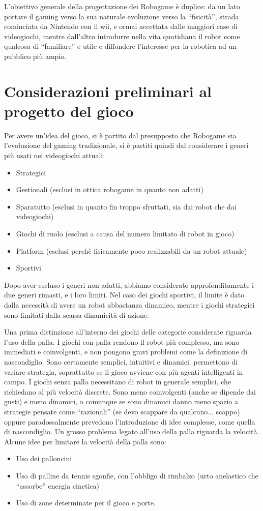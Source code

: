 L'obiettivo generale della progettazione dei Robogame è duplice: da un lato portare il gaming verso la sua naturale evoluzione verso la “fisicità”, strada cominciata da Nintendo con il wii, e ormai accettata dalle maggiori case di videogiochi, mentre dall'altro introdurre nella vita quotidiana il robot come qualcosa di “familiare” e utile e diffondere l’interesse per la robotica ad un pubblico più ampio.

\section{Considerazioni preliminari al progetto del gioco}
Per avere un’idea del gioco, si è partito dal presupposto che Robogame sia l’evoluzione del gaming tradizionale, si è partiti quindi dal considerare i generi più usati nei videogiochi attuali:
\begin{itemize}
\item Strategici
\item Gestionali (esclusi in ottica robogame in quanto non adatti)
\item Sparatutto (esclusi in quanto fin troppo sfruttati, sia dai robot che dai videogiochi)
\item Giochi di ruolo (esclusi a causa del numero limitato di robot in gioco)
\item Platform (esclusi perchè fisicamente poco realizzabili da un robot attuale)
\item Sportivi
\end{itemize}
Dopo aver escluso i generi non adatti, abbiamo considerato approfonditamente i due generi rimasti, e i loro limiti. Nel caso dei giochi sportivi, il limite è dato dalla necessità di avere un robot abbastanza dinamico, mentre i giochi strategici sono limitati dalla scarsa dinamicità di azione.

Una prima distinzione all'interno dei giochi delle categorie considerate riguarda l'uso della palla.
I giochi con palla rendono il robot più complesso, ma sono immediati e coinvolgenti, e non pongono gravi problemi come la definizione di nascondiglio. Sono certamente semplici, intuitivi e dinamici. permettono di variare strategia, soprattutto se il gioco avviene con più agenti intelligenti in campo.
I giochi senza palla necessitano di robot in generale semplici, che richiedano al più velocità discrete. Sono meno coinvolgenti (anche se dipende dai gusti) e meno dinamici, o comunque se sono dinamici danno meno spazio a strategie pensate come “razionali” (se devo scappare da qualcuno... scappo) oppure paradossalmente prevedono l’introduzione di idee complesse, come quella di nascondiglio.
Un grosso problema legato all'uso della palla riguarda la velocità. Alcune idee per limitare la velocità della palla sono:
\begin{itemize}
\item Uso dei palloncini
\item Uso di palline da tennis sgonfie, con l’obbligo di rimbalzo (urto anelastico che “assorbe” energia cinetica)
\item Uso di zone determinate per il gioco e porte.
\end{itemize}

